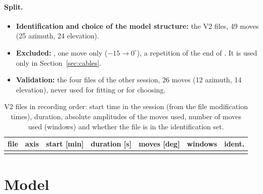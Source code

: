 \documentclass[10pt,a4paper]{article}
\numberwithin{equation}{section}
\begin{document}
\paragraph{Split.}
\begin{itemize}
\item \textbf{Identification and choice of the model structure:} the V2 files, 49 moves (25 azimuth, 24 elevation).
\item \textbf{Excluded:} , one move only ($-15\to0^\circ$), a repetition of the end of . It is used only in Section~\ref{sec:cables}.
\item \textbf{Validation:} the four files of the other session, 26 moves (12 azimuth, 14 elevation), never used for fitting or for choosing.
\end{itemize}

\begin{table}[H]\centering\small
\caption{V2 files in recording order: start time in the session (from the file modification times), duration, absolute amplitudes of the moves used, number of moves used (windows) and whether the file is in the identification set.}\label{tab:session}
\begin{tabular}{llrrL{3.4cm}rl}\toprule
file & axis & start [min] & duration [s] & moves [deg] & windows & ident. \\ \midrule
\\ \bottomrule
\end{tabular}\end{table}

\section{Model}\label{sec:model}
\end{document}
